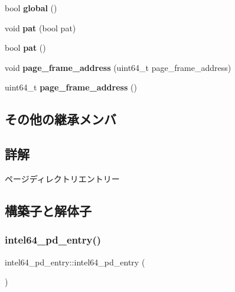 \begin{DoxyCompactItemize}
bool {\bfseries global} ()
\item 
\hypertarget{classintel64__pd__entry_ac9864990ab63553408935b0f101774d6}{}\label{classintel64__pd__entry_ac9864990ab63553408935b0f101774d6} 
void {\bfseries pat} (bool pat)
\item 
\hypertarget{classintel64__pd__entry_a66404e581382d3998719bab4a031cac1}{}\label{classintel64__pd__entry_a66404e581382d3998719bab4a031cac1} 
bool {\bfseries pat} ()
\item 
\hypertarget{classintel64__pd__entry_a23b7d02f1ce642a18605ce8fd634eca0}{}\label{classintel64__pd__entry_a23b7d02f1ce642a18605ce8fd634eca0} 
void {\bfseries page\+\_\+frame\+\_\+address} (uint64\+\_\+t page\+\_\+frame\+\_\+address)
\item 
\hypertarget{classintel64__pd__entry_a19732a944e439b21c350089133432916}{}\label{classintel64__pd__entry_a19732a944e439b21c350089133432916} 
uint64\+\_\+t {\bfseries page\+\_\+frame\+\_\+address} ()
\end{DoxyCompactItemize}
\subsection*{その他の継承メンバ}


\subsection{詳解}
ページディレクトリエントリー 

\subsection{構築子と解体子}
\hypertarget{classintel64__pd__entry_a65857cd7c61a44f5e3431d28a4302ce0}{}\label{classintel64__pd__entry_a65857cd7c61a44f5e3431d28a4302ce0} 
\subsubsection{\texorpdfstring{intel64\+\_\+pd\+\_\+entry()}{intel64\_pd\_entry()}\hspace{0.1cm}{\footnotesize\ttfamily [1/3]}}
{\footnotesize\ttfamily intel64\+\_\+pd\+\_\+entry\+::intel64\+\_\+pd\+\_\+entry (\begin{DoxyParamCaption}{ }\end{DoxyParamCaption})}

